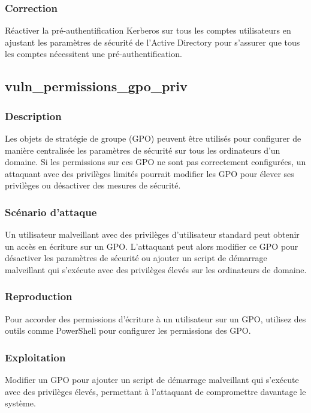 \documentclass{article}
\begin{document}
\subsubsection{Correction}
Réactiver la pré-authentification Kerberos sur tous les comptes utilisateurs en ajustant les paramètres de sécurité de l'Active Directory pour s'assurer que tous les comptes nécessitent une pré-authentification.

\subsection{vuln\_permissions\_gpo\_priv}

\subsubsection{Description}
Les objets de stratégie de groupe (GPO) peuvent être utilisés pour configurer de manière centralisée les paramètres de sécurité sur tous les ordinateurs d'un domaine. Si les permissions sur ces GPO ne sont pas correctement configurées, un attaquant avec des privilèges limités pourrait modifier les GPO pour élever ses privilèges ou désactiver des mesures de sécurité.

\subsubsection{Scénario d'attaque}
Un utilisateur malveillant avec des privilèges d'utilisateur standard peut obtenir un accès en écriture sur un GPO. L'attaquant peut alors modifier ce GPO pour désactiver les paramètres de sécurité ou ajouter un script de démarrage malveillant qui s'exécute avec des privilèges élevés sur les ordinateurs de domaine.

\subsubsection{Reproduction}
Pour accorder des permissions d'écriture à un utilisateur sur un GPO, utilisez des outils comme PowerShell pour configurer les permissions des GPO.

\subsubsection{Exploitation}
Modifier un GPO pour ajouter un script de démarrage malveillant qui s'exécute avec des privilèges élevés, permettant à l'attaquant de compromettre davantage le système.
\end{document}
